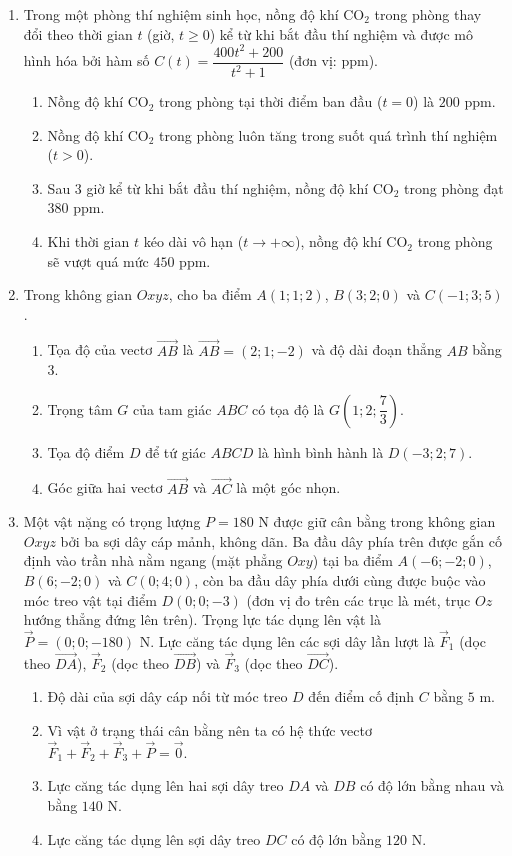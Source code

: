 \documentclass[12pt,a4paper]{article}
\begin{document}
\newpage
\begin{enumerate}[start=2]
\item Trong một phòng thí nghiệm sinh học, nồng độ khí $\text{CO}_2$ trong phòng thay đổi theo thời gian $t$ (giờ, $t\ge 0$) kể từ khi bắt đầu thí nghiệm và được mô hình hóa bởi hàm số $C(t)=\dfrac{400t^2+200}{t^2+1}$ (đơn vị: ppm).
\begin{enumerate}
\item Nồng độ khí $\text{CO}_2$ trong phòng tại thời điểm ban đầu ($t=0$) là $200\text{ ppm}$.
\item Nồng độ khí $\text{CO}_2$ trong phòng luôn tăng trong suốt quá trình thí nghiệm ($t>0$).
\item Sau $3$ giờ kể từ khi bắt đầu thí nghiệm, nồng độ khí $\text{CO}_2$ trong phòng đạt $380\text{ ppm}$.
\item Khi thời gian $t$ kéo dài vô hạn ($t\to+\infty$), nồng độ khí $\text{CO}_2$ trong phòng sẽ vượt quá mức $450\text{ ppm}$.
\end{enumerate}

\item Trong không gian $Oxyz$, cho ba điểm $A(1;1;2)$, $B(3;2;0)$ và $C(-1;3;5)$.
\begin{enumerate}
\item Tọa độ của vectơ $\vec{AB}$ là $\vec{AB}=(2;1;-2)$ và độ dài đoạn thẳng $AB$ bằng $3$.
\item Trọng tâm $G$ của tam giác $ABC$ có tọa độ là $G\left(1;2;\dfrac{7}{3}\right)$.
\item Tọa độ điểm $D$ để tứ giác $ABCD$ là hình bình hành là $D(-3;2;7)$.
\item Góc giữa hai vectơ $\vec{AB}$ và $\vec{AC}$ là một góc nhọn.
\end{enumerate}

\item Một vật nặng có trọng lượng $P=180\text{ N}$ được giữ cân bằng trong không gian $Oxyz$ bởi ba sợi dây cáp mảnh, không dãn. Ba đầu dây phía trên được gắn cố định vào trần nhà nằm ngang (mặt phẳng $Oxy$) tại ba điểm $A(-6;-2;0)$, $B(6;-2;0)$ và $C(0;4;0)$, còn ba đầu dây phía dưới cùng được buộc vào móc treo vật tại điểm $D(0;0;-3)$ (đơn vị đo trên các trục là mét, trục $Oz$ hướng thẳng đứng lên trên). Trọng lực tác dụng lên vật là $\vec{P}=(0;0;-180)\text{ N}$. Lực căng tác dụng lên các sợi dây lần lượt là $\vec{F}_1$ (dọc theo $\vec{DA}$), $\vec{F}_2$ (dọc theo $\vec{DB}$) và $\vec{F}_3$ (dọc theo $\vec{DC}$).
\begin{enumerate}
\item Độ dài của sợi dây cáp nối từ móc treo $D$ đến điểm cố định $C$ bằng $5\text{ m}$.
\item Vì vật ở trạng thái cân bằng nên ta có hệ thức vectơ $\vec{F}_1+\vec{F}_2+\vec{F}_3+\vec{P}=\vec{0}$.
\item Lực căng tác dụng lên hai sợi dây treo $DA$ và $DB$ có độ lớn bằng nhau và bằng $140\text{ N}$.
\item Lực căng tác dụng lên sợi dây treo $DC$ có độ lớn bằng $120\text{ N}$.
\end{enumerate}
\end{enumerate}
\end{document}
